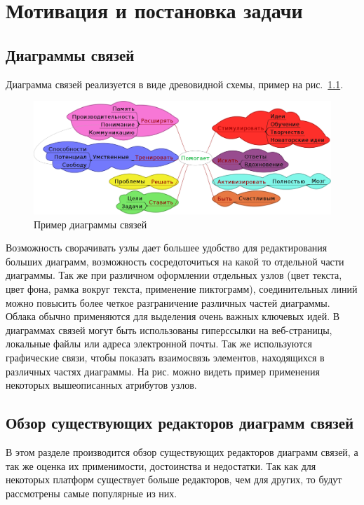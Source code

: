 \newpage

\chapter{Мотивация и постановка задачи}\label{ch:chapter_1}

\section{Диаграммы связей}
Диаграмма связей реализуется в виде древовидной схемы, пример на рис.~\ref{ris:mindmap}.
\begin{figure}[h!]
\centering
\includegraphics[width=1\linewidth]{mind-map}
\caption{Пример диаграммы связей}
\label{ris:mindmap}
\end{figure}

Возможность сворачивать узлы дает большее удобство для редактирования больших диаграмм, возможность сосредоточиться на какой то отдельной части диаграммы. Так же при различном оформлении отдельных узлов (цвет текста, цвет фона, рамка вокруг текста, применение пиктограмм), соединительных линий можно повысить более четкое разграничение различных частей диаграммы. Облака обычно применяются для выделения очень важных ключевых идей. В диаграммах связей могут быть использованы гиперссылки на веб-страницы, локальные файлы или адреса электронной почты. Так же используются графические связи, чтобы показать взаимосвязь элементов, находящихся в различных частях диаграммы. На рис. можно видеть пример применения некоторых вышеописанных атрибутов узлов.

\section{Обзор существующих редакторов диаграмм связей}\label{sec:overview_of_mind_map}

В этом разделе производится обзор существующих редакторов диаграмм связей, а так же оценка их применимости, достоинства и недостатки. Так как для некоторых платформ существует больше редакторов, чем для других, то будут рассмотрены самые популярные из них.

